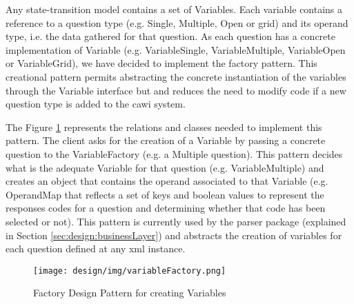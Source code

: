	Any state-transition model contains a set of Variables. Each variable contains a reference to a question type (e.g. Single, Multiple, Open or grid) and its operand type, i.e. the data gathered for that question. As each question has a concrete implementation of Variable (e.g. VariableSingle, VariableMultiple, VariableOpen or VariableGrid), we have decided to implement the factory pattern. This creational pattern permits abstracting the concrete instantiation of the variables through the Variable interface but and reduces the need to modify code if a new question type is added to the \gls{cawi} system.

	The Figure \ref{fig:design:factoryPattern} represents the relations and classes needed to implement this pattern. The client asks for the creation of a Variable by passing a concrete question to the VariableFactory (e.g. a Multiple question). This pattern decides what is the adequate Variable for that question (e.g. VariableMultiple) and creates an object that contains the operand associated to that Variable (e.g. OperandMap that reflects a set of keys and boolean values to represent the responses codes for a question and determining whether that code has been selected or not). This pattern is currently used by the parser package (explained in Section \ref{sec:design:businessLayer}) and abstracts the creation of variables for each question defined at any \gls{xml} instance.

	\begin{figure}[H]
	\centering
	\texttt{[image: design/img/variableFactory.png]}
	\caption{Factory Design Pattern for creating Variables}
	\label{fig:design:factoryPattern}
	\end{figure}

	

